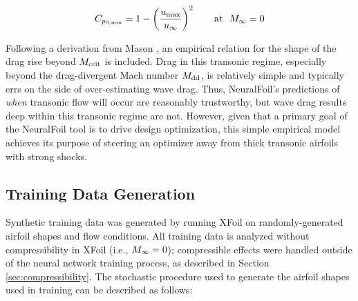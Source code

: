 \documentclass[journal]{new-aiaa}
\begin{document}
\begin{equation}
    C_{p_{0,\rm min}} = 1 - \left( \frac{u_{\rm max}}{u_\infty} \right)^2 \qquad \text{at }\ M_\infty = 0
\end{equation}

Following a derivation from Mason \cite{masonTransonicAerodynamicsAirfoils2006}, an empirical relation for the shape of the drag rise beyond $M_{\rm crit}$ is included. Drag in this transonic regime, especially beyond the drag-divergent Mach number $M_{\rm dd}$, is relatively simple and typically errs on the side of over-estimating wave drag. Thus, NeuralFoil's predictions of \textit{when} transonic flow will occur are reasonably trustworthy, but wave drag results deep within this transonic regime are not. However, given that a primary goal of the NeuralFoil tool is to drive design optimization, this simple empirical model achieves its purpose of steering an optimizer away from thick transonic airfoils with strong shocks.

\subsection{Training Data Generation}
\label{sec:training-data}

Synthetic training data was generated by running XFoil on randomly-generated airfoil shapes and flow conditions. All training data is analyzed without compressibility in XFoil (i.e., $M_\infty=0$); compressible effects were handled outside of the neural network training process, as described in Section \ref{sec:compressibility}. The stochastic procedure used to generate the airfoil shapes used in training can be described as follows:
\end{document}
